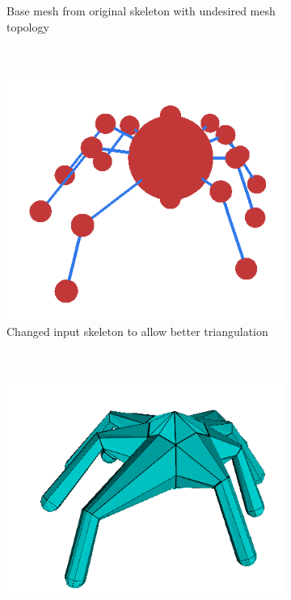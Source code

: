 \begin{figure}
\begin{subfigure}[b]{0.4\textwidth}
                \caption{Base mesh from original skeleton with undesired mesh topology}
                \label{fig:pavuk_mesh_1}
        \end{subfigure}
        \\ %
        \begin{subfigure}[b]{0.4\textwidth}
                \includegraphics[width=\textwidth]{images/pavuk_kostra_upravena.png}
                \caption{Changed input skeleton to allow better triangulation}
                \label{fig:pavuk_skl_2}
        \end{subfigure}
        ~ %
        \begin{subfigure}[b]{0.4\textwidth}
                \includegraphics[width=\textwidth]{images/pavuk_dobry.png}

\end{subfigure}
\end{figure}
